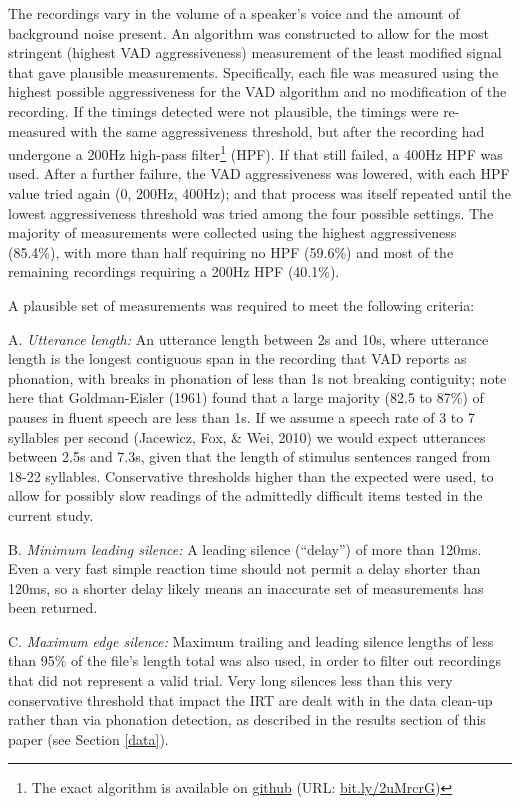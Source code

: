 \documentclass[11pt,oneside]{book}
\let\rmarkdownfootnote\footnote%
\def\footnote{\protect\rmarkdownfootnote}
\begin{document}
The recordings vary in the volume of a speaker's voice and the amount of background noise present. An algorithm was constructed to allow for the most stringent (highest VAD aggressiveness) measurement of the least modified signal that gave plausible measurements. Specifically, each file was measured using the highest possible aggressiveness for the VAD algorithm and no modification of the recording. If the timings detected were not plausible, the timings were re-measured with the same aggressiveness threshold, but after the recording had undergone a 200Hz high-pass filter\footnote{The exact algorithm is available on \href{https://gist.github.com/moui72/4ebc4eb8f69eb9fdb1cab160ce299675}{github} (URL: \href{https://bit.ly/2uMrcrG}{bit.ly/2uMrcrG})} (HPF). If that still failed, a 400Hz HPF was used. After a further failure, the VAD aggressiveness was lowered, with each HPF value tried again (0, 200Hz, 400Hz); and that process was itself repeated until the lowest aggressiveness threshold was tried among the four possible settings. The majority of measurements were collected using the highest aggressiveness (85.4\%), with more than half requiring no HPF (59.6\%) and most of the remaining recordings requiring a 200Hz HPF (40.1\%).

A plausible set of measurements was required to meet the following criteria:

A. \emph{Utterance length:} An utterance length between 2s and 10s, where utterance length is the longest contiguous span in the recording that VAD reports as phonation, with breaks in phonation of less than 1s not breaking contiguity; note here that Goldman-Eisler (1961) found that a large majority (82.5 to 87\%) of pauses in fluent speech are less than 1s. If we assume a speech rate of 3 to 7 syllables per second (Jacewicz, Fox, \& Wei, 2010) we would expect utterances between 2.5s and 7.3s, given that the length of stimulus sentences ranged from 18-22 syllables. Conservative thresholds higher than the expected were used, to allow for possibly slow readings of the admittedly difficult items tested in the current study.

B. \emph{Minimum leading silence:} A leading silence (``delay'') of more than 120ms. Even a very fast simple reaction time should not permit a delay shorter than 120ms, so a shorter delay likely means an inaccurate set of measurements has been returned.

C. \emph{Maximum edge silence:} Maximum trailing and leading silence lengths of less than 95\% of the file's length total was also used, in order to filter out recordings that did not represent a valid trial. Very long silences less than this very conservative threshold that impact the IRT are dealt with in the data clean-up rather than via phonation detection, as described in the results section of this paper (see Section \ref{data}).
\end{document}
